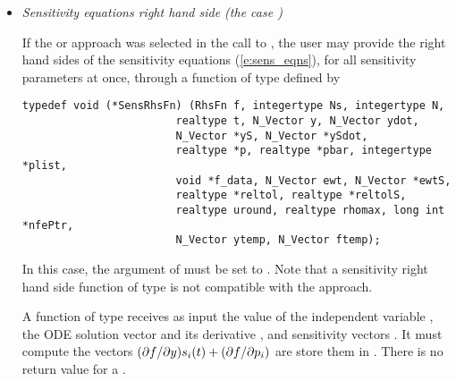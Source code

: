 \begin{itemize}
%
\item {\em Sensitivity equations right hand side (the case )}

  If the  or  approach was selected in the call to
  , the user may provide the right hand sides of the sensitivity equations
  (\ref{e:sens_eqns}), for all sensitivity parameters at once, through a function 
  of type  defined by
\begin{verbatim}
typedef void (*SensRhsFn) (RhsFn f, integertype Ns, integertype N, 
                        realtype t, N_Vector y, N_Vector ydot, 
                        N_Vector *yS, N_Vector *ySdot, 
                        realtype *p, realtype *pbar, integertype *plist,
                        void *f_data, N_Vector ewt, N_Vector *ewtS, 
                        realtype *reltol, realtype *reltolS,
                        realtype uround, realtype rhomax, long int *nfePtr,
                        N_Vector ytemp, N_Vector ftemp);
\end{verbatim}
  In this case, the argument  of  must be set to .
  Note that a sensitivity right hand side function of type  is not
  compatible with the  approach.

  A function of type   receives as input the value of the independent
  variable , the ODE solution vector  and its derivative , 
  and sensitivity vectors . It must compute the vectors
  $(\partial f / \partial y) s_i(t) + (\partial f / \partial p_i)$ are store them in . 
  There is no return value for a .


\end{itemize}
